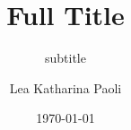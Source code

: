 \let\oldenumerate\enumerate
\let\endoldenumerate\endenumerate
\renewenvironment{enumerate}{\begin{safenumerate}}{\end{safenumerate}}


\title[Short Title 
]{Full Title} %
\subtitle{subtitle}
\author[L. Paoli]{Lea Katharina Paoli}
\date{\today}
